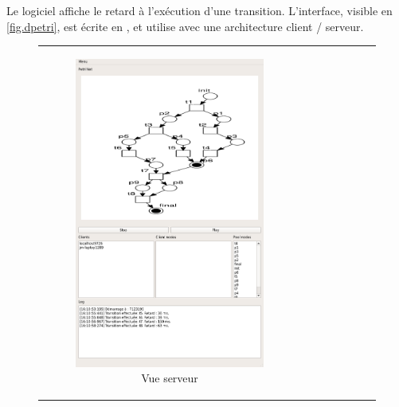 Le logiciel affiche le retard à l'exécution d'une transition. L'interface, visible en \cref{fig.dpetri}, est écrite en , et utilise  avec une architecture client / serveur.
\begin{figure}[H]
	\centering
	\begin{tabu} to \linewidth {cc}
	\begin{subfigure}{.5\textwidth}
		\centering
		\includegraphics[scale=0.3]{images/dpetriServer.png}
		\caption{Vue serveur}
	\end{subfigure} &
	\begin{subfigure}{.5\textwidth}
		\centering

\end{subfigure}
\end{tabu}
\end{figure}
